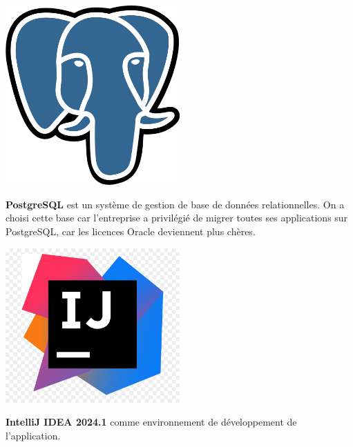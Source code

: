 \begin{center}
    \vspace{2em} %
    
    \begin{minipage}{\textwidth}
        \begin{minipage}{0.2\textwidth}
            \centering
            \includegraphics[width=0.5\textwidth]{images/logo/postgres.svg.png}
        \end{minipage}\hfill
        \begin{minipage}{0.75\textwidth}
            \textbf{PostgreSQL} est un système de gestion de base de données relationnelles. On a choisi cette base car l'entreprise a privilégié de migrer toutes ses applications sur PostgreSQL, car les licences Oracle deviennent plus chères.
        \end{minipage}
    \end{minipage}

    \vspace{2em} %
    
    \begin{minipage}{\textwidth}
        \begin{minipage}{0.2\textwidth}
            \centering
            \includegraphics[width=0.5\textwidth]{images/logo/ittelij.jpg}
        \end{minipage}\hfill
        \begin{minipage}{0.75\textwidth}
            \textbf{IntelliJ IDEA 2024.1} comme environnement de développement de l'application.
        \end{minipage}
    \end{minipage}


\end{center}
